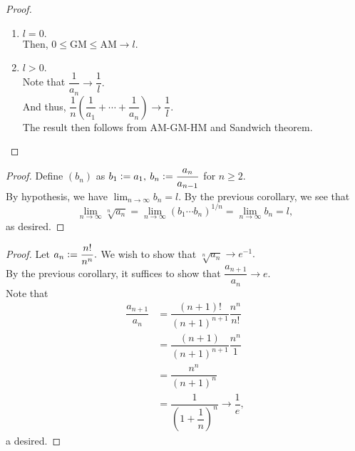 \corcauchfirst*\label{cor:corcauchfirst2}
\begin{flushright}\hyperref[cor:corcauchfirst]{\upsym}\end{flushright}
\begin{proof}\phantom{newline}\\
	\begin{enumerate}[label = Case \arabic*.]
		\item $l = 0.$\\
		Then, $0 \le \text{GM} \le \text{AM} \to l.$
		\item $l > 0.$\\
		Note that $\dfrac{1}{a_n} \to \dfrac{1}{l}.$\\
		And thus, $\dfrac{1}{n}\left(\dfrac{1}{a_1} + \cdots + \dfrac{1}{a_n}\right) \to \dfrac{1}{l}.$\\
		The result then follows from AM-GM-HM and Sandwich theorem.
	\end{enumerate}
\end{proof}

\cauchysecond*\label{thm:cauchysecond2}
\begin{flushright}\hyperref[thm:cauchysecond]{\upsym}\end{flushright}
\begin{proof}
	Define $(b_n)$ as $b_1 \vcentcolon= a_1,$ $b_n \vcentcolon= \dfrac{a_{n}}{a_{n-1}}$ for $n \ge 2.$\\
	By hypothesis, we have $\displaystyle\lim_{n\to \infty}b_n = l.$ By the previous corollary, we see that
	\begin{equation*} 
		\lim_{n\to \infty}\sqrt[n]{a_n} = \lim_{n\to \infty}(b_1\cdots b_n)^{1/n} = \lim_{n\to \infty}b_n = l,
	\end{equation*}
	as desired.
\end{proof}

\cauchysecondcor*\label{cor:cauchysecondcor2}
\begin{flushright}\hyperref[cor:cauchysecondcor]{\upsym}\end{flushright}
\begin{proof}
	Let $a_n \vcentcolon= \dfrac{n!}{n^n}.$ We wish to show that $\sqrt[n]{a_n} \to e^{-1}.$\\
	By the previous corollary, it suffices to show that $\dfrac{a_{n+1}}{a_n} \to e.$\\
	Note that
	\begin{align*} 
		\dfrac{a_{n+1}}{a_n} &= \dfrac{(n+1)!}{(n+1)^{n+1}}\dfrac{n^n}{n!}\\
		&= \dfrac{(n+1)}{(n+1)^{n+1}}\dfrac{n^n}{1}\\
		&= \dfrac{n^n}{(n+1)^n}\\
		&= \dfrac{1}{\left(1 + \dfrac{1}{n}\right)^{n}} \to \dfrac{1}{e},
	\end{align*}
	a desired.
\end{proof}

